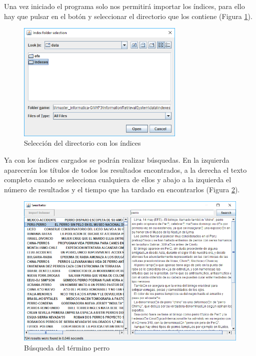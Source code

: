 Una vez iniciado el programa solo nos permitirá importar los índices, para ello hay que pulsar en el botón y seleccionar el directorio que los contiene (Figura \ref{fig:index-folder-selection}).

\begin{figure}[H]
	\centering
	\includegraphics[width=8cm]{img/index-folder-selection}
	\caption{Selección del directorio con los índices}
	\label{fig:index-folder-selection}
\end{figure}

Ya con los índices cargados se podrán realizar búsquedas. En la izquierda aparecerán los títulos de todos los resultados encontrados, a la derecha el texto completo cuando se selecciona cualquiera de ellos y abajo a la izquierda el número de resultados y el tiempo que ha tardado en encontrarlos (Figura \ref{fig:search}).

\begin{figure}[H]
	\centering
	\includegraphics[width=12cm]{img/search}
	\caption{Búsqueda del término perro}
	\label{fig:search}
\end{figure}




